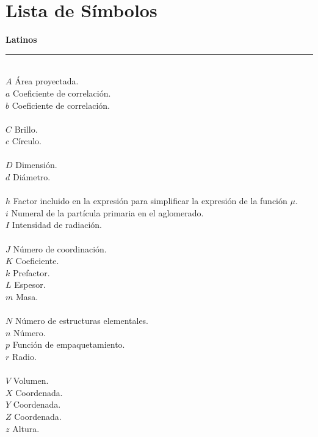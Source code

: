 \chapter*{Lista de Símbolos}
{\Large \textbf{Latinos}}\\
\hrule
\normalsize
~        \hfill   ~\\
$A$ \hfill Área proyectada.\\
$a$ \hfill Coeficiente de correlación.\\
$b$ \hfill Coeficiente de correlación.\\
\\
$C$ \hfill Brillo.\\
$c$ \hfill Círculo.\\
\\
$D$ \hfill Dimensión.\\
$d$ \hfill Diámetro.\\
\\
$h$ \hfill Factor incluido en la expresión para simplificar la expresión de la función $\mu$.\\
$i$	\hfill Numeral de la partícula primaria en el aglomerado.\\
$I$ \hfill Intensidad de radiación.\\
\\
$J$	\hfill Número de coordinación.\\
$K$	\hfill Coeficiente.\\
$k$	\hfill Prefactor.\\
$L$	\hfill Espesor.\\
$m$	\hfill Masa.\\
\\
$N$	\hfill Número de estructuras elementales.\\
$n$	\hfill Número.\\
$p$	\hfill Función de empaquetamiento.\\
$r$	\hfill Radio.\\
\\
$V$	\hfill Volumen.\\
$X$	\hfill Coordenada.\\
$Y$	\hfill Coordenada.\\
$Z$	\hfill Coordenada.\\
$z$	\hfill Altura.\\

\newpage

